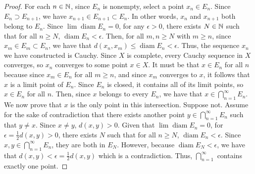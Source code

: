 \documentclass[11pt]{article}
\DeclareMathOperator{\diam}{diam}
\begin{document}
\begin{exercise}{21}
    \begin{proof}
        For each $n \in \mathbb{N}$, since $E_n$ is nonempty, select a point $x_n \in E_n$. Since $E_n \supset E_{n+1}$, we have $x_{n+1} \in E_{n+1} \subset E_n$. In other words, $x_n$ and $x_{n+1}$ both belong to $E_n$. Since $\lim \diam E_n = 0$, for any $\epsilon > 0$, there exists $N \in \mathbb{N}$ such that for all $n \ge N$, $\diam E_n < \epsilon$. Then, for all $m, n \ge N$ with $ m \ge n$, since $x_m \in E_m \subset E_n$, we have that $d(x_n, x_m) \le \diam E_n < \epsilon$. Thus, the sequence $x_n$ we have constructed is Cauchy. Since $X$ is complete, every Cauchy sequence in $X$ converges, so $x_n$ converges to some point $x \in X$. It must be that $x \in E_n$ for all $n$ because since $x_m \in E_n$ for all $m \ge n$, and since $x_m$ converges to $x$, it follows that $x$ is a limit point of $E_n$. Since $E_n$ is closed, it contains all of its limit points, so $x \in E_n$ for all $n$. Then, since $x$ belongs to every $E_n$, we have that $x \in \bigcap_{n=1}^\infty E_n$. We now prove that $x$ is the only point in this intersection. Suppose not. Assume for the sake of contradiction that there exists another point $y \in \bigcap_{n=1}^\infty E_n$ such that $y \neq x$. Since $x \neq y$, $d(x, y) > 0$. Given that $\lim \diam E_n = 0$, for $\epsilon = \frac{1}{2} d(x, y) > 0$, there exists $N$ such that for all $n \ge N$, $\diam E_n < \epsilon$. Since $x, y \in \bigcap_{n=1}^\infty E_n$, they are both in $E_N$. However, because $\diam E_N < \epsilon$, we have that $d(x, y) < \epsilon = \frac{1}{2} d(x, y)$ which is a contradiction. Thus, $\bigcap_{n=1}^\infty$ contains exactly one point. 
    \end{proof}
\end{exercise}
\end{document}

